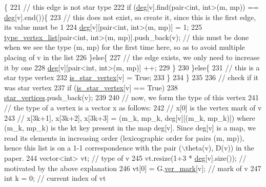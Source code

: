 \begin{DoxyCode}
      \{
221         \textcolor{comment}{// this edge is not star type}
222         \textcolor{keywordflow}{if} (\hyperlink{classcolored__graph_ae3269d35c1b022bc70d195bebd4e1b8a}{deg}[v].find(pair<int, int>(m, mp)) == \hyperlink{classcolored__graph_ae3269d35c1b022bc70d195bebd4e1b8a}{deg}[v].end())\{
223           \textcolor{comment}{// this does not exist, so create it, since this is the first edge, its value must be 1}
224           \hyperlink{classcolored__graph_ae3269d35c1b022bc70d195bebd4e1b8a}{deg}[v][pair<int, int>(m, mp)] = 1;
225           \hyperlink{classcolored__graph_a8a7e4022653cdcda00155e106d8914f6}{type\_vertex\_list}[pair<int, int>(m, mp)].push\_back(v); \textcolor{comment}{// this must be done when
       we see the type (m, mp) for the first time here, so as to avoid multiple placing of v in the list }
226         \}\textcolor{keywordflow}{else}\{
227           \textcolor{comment}{// the edge exists, we only need to increase it by one}
228           \hyperlink{classcolored__graph_ae3269d35c1b022bc70d195bebd4e1b8a}{deg}[v][pair<int, int>(m, mp)] ++;
229         \}
230       \}\textcolor{keywordflow}{else}\{
231         \textcolor{comment}{// this is a star type vertex}
232         \hyperlink{classcolored__graph_ad41163e970530c7e45878d299f0dc961}{is\_star\_vertex}[v] = True;
233       \}
234     \}
235 
236     \textcolor{comment}{// check if it was star vertex}
237     \textcolor{keywordflow}{if} (\hyperlink{classcolored__graph_ad41163e970530c7e45878d299f0dc961}{is\_star\_vertex}[v] == True)
238       \hyperlink{classcolored__graph_ab7ee8d717abde7ad7467ef695038f574}{star\_vertices}.push\_back(v);
239 
240     \textcolor{comment}{// now, we form the type of this vertex}
241     \textcolor{comment}{// the type of a vertex is a vector x as follows:}
242     \textcolor{comment}{// x[0] is the vertex mark of v}
243     \textcolor{comment}{// x[3k+1], x[3k+2], x[3k+3] = (m\_k, mp\_k, deg[v][(m\_k, mp\_k)]) where (m\_k, mp\_k) is the kt key present
       in the map deg[v]. Since deg[v] is a map, we read its elements in increasing order (lexicographic order for
       pairs (m, mp)), hence this list is on a 1-1 correspondence with the pair (\(\backslash\)theta(v), D(v)) in the paper.}
244     vector<int> vt; \textcolor{comment}{// type of v}
245     vt.resize(1+3 * \hyperlink{classcolored__graph_ae3269d35c1b022bc70d195bebd4e1b8a}{deg}[v].size()); \textcolor{comment}{// motivated by the above explanation}
246     vt[0] = G.\hyperlink{classmarked__graph_ac83e9377dd4d8bb95be1ac949b127296}{ver\_mark}[v]; \textcolor{comment}{// mark of v}
247     \textcolor{keywordtype}{int} k = 0; \textcolor{comment}{// current index of vt}

\end{DoxyCode}

